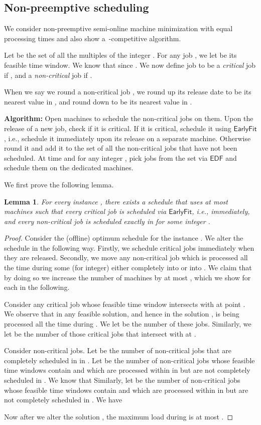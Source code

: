 \documentclass[letterpaper,11pt]{article}
\newtheorem{lemma}{Lemma}
\newcommand{\EDF}{\ensuremath{\mathsf{EDF}}\xspace}
\newcommand{\Earlyfit}{\ensuremath{\mathsf{EarlyFit}}\xspace}
\begin{document}
\subsection{Non-preemptive scheduling}

We consider non-preemptive semi-online machine minimization with equal processing times and also show a~-competitive algorithm. 

Let  be the set of all the multiples of the integer . For any job , we let  be its feasible time window. We know that  since . We now define job  to be a {\em critical} job if , and a {\em non-critical} job if . 

When we say we round a non-critical job , we round up its release date  to be its nearest value in , and round down  to be its nearest value in . 
\medskip

\noindent\textbf{Algorithm:} Open  machines to schedule the non-critical jobs on them. Upon the release of a new job, check if it is critical. If it is critical, schedule it using \Earlyfit, i.e., schedule it immediately upon its release on a separate machine. Otherwise round it and add it to the set of all the non-critical jobs that have not been scheduled. At time  and for any integer , pick  jobs from the set via \EDF and schedule them on the dedicated machines.
\medskip

We first prove the following lemma.

\begin{lemma}\label{lemma:nonpre-samesize-semi}
For every instance , there exists a schedule that uses at most  machines such that every critical job is scheduled via \Earlyfit, i.e., immediately, and every non-critical job is scheduled exactly in  for some integer .
\end{lemma}
\begin{proof}
Consider the (offline) optimum schedule  for the instance . We alter the schedule in the following way. Firstly, we schedule critical jobs immediately when they are released. Secondly, we move any non-critical job which is processed all the time during some  (for  integer) either completely into  or into . We claim that by doing so we increase the number of machines by at most , which we show for each  in the following. 

Consider any critical job  whose feasible time window intersects with  at point . We observe that in any feasible solution, and hence in the solution ,  is being processed all the time during . We let  be the number of these jobs. Similarly, we let  be the number of those critical jobs that intersect with  at .

Consider non-critical jobs. Let  be the number of non-critical jobs that are completely scheduled in  in . Let  be the number of non-critical jobs whose feasible time windows contain  and which are processed within  in  but are not completely scheduled in . We know that  Similarly, let  be the number of non-critical jobs whose feasible time windows contain  and which are processed within  in  but are not completely scheduled in . We have 

Now after we alter the solution , the maximum load during  is at most .
\end{proof}
\end{document}
